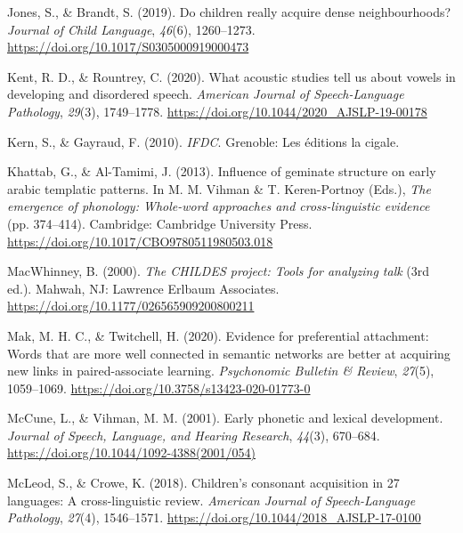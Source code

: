 \documentclass[
  man,mask,floatsintext]{apa6}
\newlength{\cslhangindent}
\newlength{\cslentryspacingunit} %
\newenvironment{CSLReferences}[2] %
 {%
  \setlength{\parindent}{0pt}
  \ifodd #1
  \let\oldpar\par
  \def\par{\hangindent=\cslhangindent\oldpar}
  \fi
  \setlength{\parskip}{#2\cslentryspacingunit}
 }%
 {}
\begin{document}
\begin{CSLReferences}{1}{0}
\leavevmode{}%
Jones, S., \& Brandt, S. (2019). Do children really acquire dense neighbourhoods? \emph{Journal of Child Language}, \emph{46}(6), 1260--1273. \url{https://doi.org/10.1017/S0305000919000473}

\leavevmode{}%
Kent, R. D., \& Rountrey, C. (2020). What acoustic studies tell us about vowels in developing and disordered speech. \emph{American Journal of Speech-Language Pathology}, \emph{29}(3), 1749--1778. \url{https://doi.org/10.1044/2020_AJSLP-19-00178}

\leavevmode{}%
Kern, S., \& Gayraud, F. (2010). \emph{{IFDC}}. Grenoble: Les éditions la cigale.

\leavevmode{}%
Khattab, G., \& Al-Tamimi, J. (2013). Influence of geminate structure on early arabic templatic patterns. In M. M. Vihman \& T. Keren-Portnoy (Eds.), \emph{The emergence of phonology: Whole-word approaches and cross-linguistic evidence} (pp. 374--414). Cambridge: Cambridge University Press. \url{https://doi.org/10.1017/CBO9780511980503.018}

\leavevmode{}%
MacWhinney, B. (2000). \emph{The {CHILDES} project: Tools for analyzing talk} (3rd ed.). Mahwah, {NJ}: Lawrence Erlbaum Associates. \url{https://doi.org/10.1177/026565909200800211}

\leavevmode{}%
Mak, M. H. C., \& Twitchell, H. (2020). Evidence for preferential attachment: Words that are more well connected in semantic networks are better at acquiring new links in paired-associate learning. \emph{Psychonomic Bulletin \& Review}, \emph{27}(5), 1059--1069. \url{https://doi.org/10.3758/s13423-020-01773-0}

\leavevmode{}%
McCune, L., \& Vihman, M. M. (2001). Early phonetic and lexical development. \emph{Journal of Speech, Language, and Hearing Research}, \emph{44}(3), 670--684. \url{https://doi.org/10.1044/1092-4388(2001/054)}

\leavevmode{}%
McLeod, S., \& Crowe, K. (2018). Children's consonant acquisition in 27 languages: A cross-linguistic review. \emph{American Journal of Speech-Language Pathology}, \emph{27}(4), 1546--1571. \url{https://doi.org/10.1044/2018_AJSLP-17-0100}


\end{CSLReferences}
\end{document}
